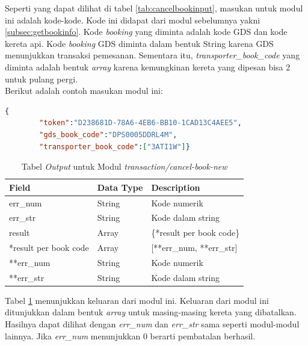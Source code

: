 Seperti yang dapat dilihat di tabel \ref{tab:cancelbookinput}, masukan untuk modul ini adalah kode-kode. Kode ini didapat dari modul sebelumnya yakni \ref{subsec:getbookinfo}. Kode \textit{booking} yang diminta adalah kode GDS dan kode kereta api. Kode \textit{booking} GDS diminta dalam bentuk String karena GDS menunjukkan transaksi pemesanan. Sementara itu, \textit{transporter\_book\_code} yang diminta adalah bentuk \textit{array} karena kemungkinan kereta yang dipesan bisa 2 untuk pulang pergi.\\

Berikut adalah contoh masukan modul ini:

\begin{lstlisting}[language=json]
    {
        "token":"D238681D-78A6-4EB6-BB10-1CAD13C4AEE5",
        "gds_book_code":"DPS0005DDRL4M",
        "transporter_book_code":["3ATI1W"]}
\end{lstlisting}

\begin{table}[H]
	\centering 
	\caption{Tabel \textit{Output} untuk Modul \textit{transaction/cancel-book-new}}
	\label{tab:cancelbookoutput}
	\begin{tabular}{|l|l|p{8cm}|}
		\hline
		Field & Data Type & Description\\
		\hline

		\hline
        err\_num & String & Kode numerik\\
        \hline
        err\_str & String & Kode dalam string\\
        \hline
        result & Array & \{*result per book code\}\\
        \hline
        \hline
        *result per book code & Array & [{**err\_num, **err\_str}]\\
        \hline
        **err\_num & String & Kode numerik\\
        \hline
        **err\_str & String & Kode dalam string\\
        \hline
		
	\end{tabular} 
\end{table}

Tabel \ref{tab:cancelbookoutput} menunjukkan keluaran dari modul ini. Keluaran dari modul ini ditunjukkan dalam bentuk \textit{array} untuk masing-masing kereta yang dibatalkan. Hasilnya dapat dilihat dengan \textit{err\_num} dan \textit{err\_str} sama seperti modul-modul lainnya. Jika \textit{err\_num} menunjukkan 0 berarti pembatalan berhasil.\\


